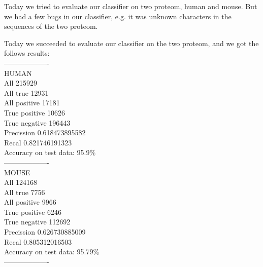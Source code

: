 \documentclass[a4paper]{tufte-handout}
\begin{document}

Today we tried to evaluate our classifier on two proteom, human and mouse. But we had a few bugs in our classifier, e.g. it was unknown characters in the sequences of  the two proteom.




Today we succeeded to evaluate our classifier on the two proteom, and we got the follows results:
\\
-------------------\\
HUMAN\\
All 215929\\
All true 12931\\
All positive 17181\\
True positive 10626\\
True negative 196443\\
Precission 0.618473895582\\
Recal 0.821746191323\\
Accuracy on test data: 95.9\%\\
-------------------\\
MOUSE\\
All 124168\\
All true 7756\\
All positive 9966\\
True positive 6246\\
True negative 112692\\
Precission 0.626730885009\\
Recal 0.805312016503\\
Accuracy on test data: 95.79\%\\
-------------------\\



\end{document}
